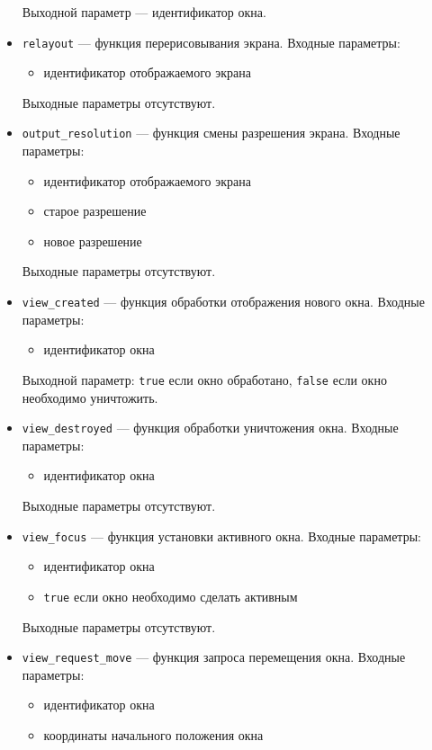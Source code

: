 \documentclass[10pt,a4paper]{report}
\begin{document}
\begin{itemize}
	Выходной параметр --- идентификатор окна.

\item \texttt{relayout} --- функция перерисовывания экрана.  Входные параметры:
	\begin{itemize}
	\item идентификатор отображаемого экрана
	\end{itemize}
	
	Выходные параметры отсутствуют.
	
\item \texttt{output\_resolution} --- функция смены разрешения экрана.  Входные параметры:
	\begin{itemize}
	\item идентификатор отображаемого экрана
	\item старое разрешение
	\item новое разрешение
	\end{itemize}
	
	Выходные параметры отсутствуют.
	
\item \texttt{view\_created} --- функция обработки отображения нового окна.  Входные параметры:
	\begin{itemize}
	\item идентификатор окна
	\end{itemize}
	
	Выходной параметр: \texttt{true} если окно обработано, \texttt{false} если окно необходимо уничтожить.
	
\item \texttt{view\_destroyed} --- функция обработки уничтожения окна.  Входные параметры:
	\begin{itemize}
	\item идентификатор окна
	\end{itemize}
	
	Выходные параметры отсутствуют.
	
\item \texttt{view\_focus} --- функция установки активного окна.  Входные параметры:
	\begin{itemize}
	\item идентификатор окна
	\item \texttt{true} если окно необходимо сделать активным
	\end{itemize}
	
	Выходные параметры отсутствуют.
	
\item \texttt{view\_request\_move} --- функция запроса перемещения окна.  Входные параметры:
	\begin{itemize}
	\item идентификатор окна
	\item координаты начального положения окна
	\end{itemize}
	

\end{itemize}
\end{document}
